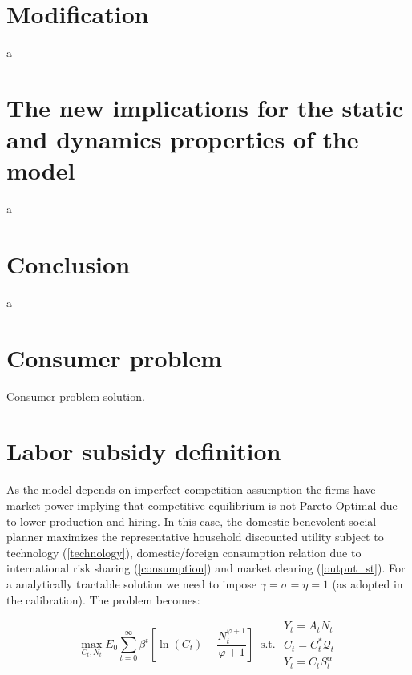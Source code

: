 \documentclass{article}
\begin{document}
\begin{figure}[H]
\centering


\end{figure}

\section{Modification}
a

\section{The new implications for the static and dynamics properties of the model}
a


\section{Conclusion}
a



\appendix
\section{Consumer problem}
Consumer problem solution.

\section{Labor subsidy definition}
As the model depends on imperfect competition assumption the firms have market power implying that competitive equilibrium is not Pareto Optimal due to lower production and hiring. In this case, the domestic benevolent social planner maximizes the representative household discounted utility subject to technology (\ref{technology}), domestic/foreign consumption relation due to international risk sharing (\ref{consumption}) and market clearing (\ref{output_st}). For a analytically tractable solution we need to impose $\gamma = \sigma = \eta = 1$ (as adopted in the calibration). The problem becomes:

$$\max_{C_t, N_t} E_0 \sum^\infty_{t=0} \beta^t \left[\ln(C_t) - \frac{N_t^{\varphi+1}}{\varphi+1} \right] \ \textrm{ s.t. } \begin{matrix}
    Y_t = A_t N_t\\
    C_t = C_t^* \mathcal Q_{t}\\
    Y_t = C_t S_t^\alpha
\end{matrix}$$
\end{document}
